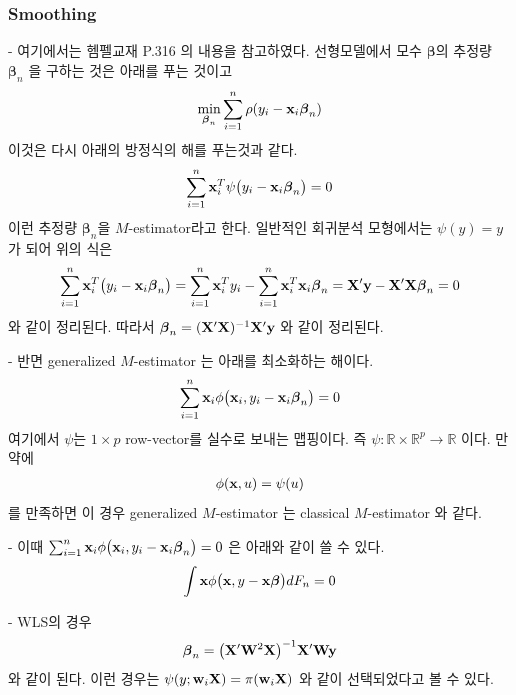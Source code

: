\documentclass[preprint, review, 12pt]{article}
\theoremstyle{definition}
\theoremstyle{remark}
\begin{document}
\subsubsection*{Smoothing}

- 여기에서는 헴펠교재 P.316 의 내용을 참고하였다. 선형모델에서 모수 $\boldsymbol{\beta}$의 추정량 $\boldsymbol{\beta}_ n$ 을 구하는 것은 아래를 푸는 것이고 
\begin{align}
\min_{\boldsymbol{\beta}_ n}\sum_{i=1}^{n}\rho(y_i-{\bf x}_ i \boldsymbol{\beta}_ n)
\end{align}
이것은 다시 아래의 방정식의 해를 푸는것과 같다. 
\begin{align}
\sum_{i=1}^{n}{\bf x}_ i^T\psi\big(y_i-{\bf x}_ i \boldsymbol{\beta}_ n\big)=0 
\end{align}
이런 추정량 $\boldsymbol{\beta}_ n$을 $M$-estimator라고 한다. 일반적인 회귀분석 모형에서는 $\psi(y)=y$ 가 되어 위의 식은 
\begin{align}
\sum_{i=1}^{n}{\bf x}_ i^T\big(y_i-{\bf x}_ i \boldsymbol{\beta}_ n\big)=\sum_{i=1}^{n}{\bf x}_ i^T y_i-\sum_{i=1}^{n}{\bf x}_ i^T {\bf x}_ i \boldsymbol{\beta}_ n= {\bf X}'{\bf y}-{\bf X}'{\bf X}\boldsymbol{\beta}_ n=0 
\end{align}
와 같이 정리된다. 따라서 $\boldsymbol{\beta}_ n = ({\bf X}'{\bf X})^{-1}{\bf X}'{\bf y}$ 와 같이 정리된다.

- 반면 generalized $M$-estimator 는 아래를 최소화하는 해이다. 
\begin{align}
\sum_{i=1}^{n}{\bf x}_ i \phi\big({\bf x}_ i , y_i-{\bf x}_ i \boldsymbol{\beta}_ n\big) =0 
\end{align}
여기에서 $\psi$는 $1\times p$ row-vector를 실수로 보내는 맵핑이다. 즉 $\psi:\mathbb{R}\times \mathbb{R}^p \to \mathbb{R}$ 이다. 만약에 
\begin{align}
\phi({\bf x},u)=\psi(u)
\end{align}
를 만족하면 이 경우 generalized $M$-estimator 는 classical $M$-estimator 와 같다. 

- 이때 $\sum_{i=1}^{n}{\bf x}_ i \phi\big({\bf x}_ i , y_i-{\bf x}_ i \boldsymbol{\beta}_ n\big) =0$ 은 아래와 같이 쓸 수 있다. 
\begin{align}
\int {\bf x} \phi\big({\bf x} , y-{\bf x} \boldsymbol{\beta}\big) dF_n=0 
\end{align}

- WLS의 경우 
\begin{align}
\boldsymbol{\beta}_ n = \big({\bf X}'{\bf W}^2{\bf X}\big)^{-1}{\bf X}'{\bf W}{\bf y}
\end{align}
와 같이 된다. 이런 경우는 $\psi(y;{\bf w}_ i {\bf X})= \pi({\bf w}_ i {\bf X}) $ 와 같이 선택되었다고 볼 수 있다. 
\end{document}
